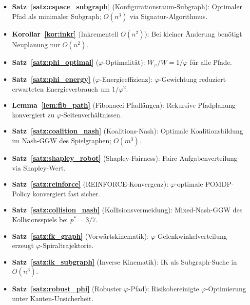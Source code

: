 ﻿\documentclass[a4paper,12pt]{article}
\theoremstyle{definition}
\begin{document}
\begin{itemize}
    \item \textbf{Satz~\ref{satz:cspace_subgraph}} (Konfigurationsraum-Subgraph):
          Optimaler Pfad als minimaler Subgraph; $O(n^3)$ via Signatur-Algorithmus.
    \item \textbf{Korollar~\ref{kor:inkr}} (Inkrementell $O(n^2)$):
          Bei kleiner \"Anderung ben\"otigt Neuplanung nur $O(n^2)$.
    \item \textbf{Satz~\ref{satz:phi_optimal}} ($\varphi$-Optimalit\"at):
          $W_\varphi/W = 1/\varphi$ f\"ur alle Pfade.
    \item \textbf{Satz~\ref{satz:phi_energy}} ($\varphi$-Energieeffizienz):
          $\varphi$-Gewichtung reduziert erwarteten Energieverbrauch um $1/\varphi^2$.
    \item \textbf{Lemma~\ref{lem:fib_path}} (Fibonacci-Pfadl\"angen):
          Rekursive Pfadplanung konvergiert zu $\varphi$-Seitenverh\"altnissen.
    \item \textbf{Satz~\ref{satz:coalition_nash}} (Koalitions-Nash):
          Optimale Koalitionsbildung im Nash-GGW des Spielgraphen; $O(m^3)$.
    \item \textbf{Satz~\ref{satz:shapley_robot}} (Shapley-Fairness):
          Faire Aufgabenverteilung via Shapley-Wert.
    \item \textbf{Satz~\ref{satz:reinforce}} (REINFORCE-Konvergenz):
          $\varphi$-optimale POMDP-Policy konvergiert fast sicher.
    \item \textbf{Satz~\ref{satz:collision_nash}} (Kollisionsvermeidung):
          Mixed-Nash-GGW des Kollisionsspiels bei $p^* = 3/7$.
    \item \textbf{Satz~\ref{satz:fk_graph}} (Vorw\"artskinematik):
          $\varphi$-Gelenkwinkelverteilung erzeugt $\varphi$-Spiraltrajektorie.
    \item \textbf{Satz~\ref{satz:ik_subgraph}} (Inverse Kinematik):
          IK als Subgraph-Suche in $O(n^3)$.
    \item \textbf{Satz~\ref{satz:robust_phi}} (Robuster $\varphi$-Pfad):
          Risikobereinigte $\varphi$-Optimierung unter Kanten-Unsicherheit.
\end{itemize}
\end{document}
